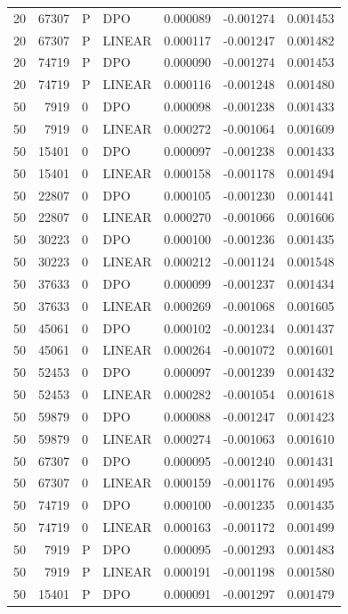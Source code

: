 \begin{longtable}{rrllrrr}
20 & 67307 & P & DPO & 0.000089 & -0.001274 & 0.001453\\
20 & 67307 & P & LINEAR & 0.000117 & -0.001247 & 0.001482\\
20 & 74719 & P & DPO & 0.000090 & -0.001274 & 0.001453\\
20 & 74719 & P & LINEAR & 0.000116 & -0.001248 & 0.001480\\
50 & 7919 & 0 & DPO & 0.000098 & -0.001238 & 0.001433\\
50 & 7919 & 0 & LINEAR & 0.000272 & -0.001064 & 0.001609\\
50 & 15401 & 0 & DPO & 0.000097 & -0.001238 & 0.001433\\
50 & 15401 & 0 & LINEAR & 0.000158 & -0.001178 & 0.001494\\
50 & 22807 & 0 & DPO & 0.000105 & -0.001230 & 0.001441\\
50 & 22807 & 0 & LINEAR & 0.000270 & -0.001066 & 0.001606\\
50 & 30223 & 0 & DPO & 0.000100 & -0.001236 & 0.001435\\
50 & 30223 & 0 & LINEAR & 0.000212 & -0.001124 & 0.001548\\
50 & 37633 & 0 & DPO & 0.000099 & -0.001237 & 0.001434\\
50 & 37633 & 0 & LINEAR & 0.000269 & -0.001068 & 0.001605\\
50 & 45061 & 0 & DPO & 0.000102 & -0.001234 & 0.001437\\
50 & 45061 & 0 & LINEAR & 0.000264 & -0.001072 & 0.001601\\
50 & 52453 & 0 & DPO & 0.000097 & -0.001239 & 0.001432\\
50 & 52453 & 0 & LINEAR & 0.000282 & -0.001054 & 0.001618\\
50 & 59879 & 0 & DPO & 0.000088 & -0.001247 & 0.001423\\
50 & 59879 & 0 & LINEAR & 0.000274 & -0.001063 & 0.001610\\
50 & 67307 & 0 & DPO & 0.000095 & -0.001240 & 0.001431\\
50 & 67307 & 0 & LINEAR & 0.000159 & -0.001176 & 0.001495\\
50 & 74719 & 0 & DPO & 0.000100 & -0.001235 & 0.001435\\
50 & 74719 & 0 & LINEAR & 0.000163 & -0.001172 & 0.001499\\
50 & 7919 & P & DPO & 0.000095 & -0.001293 & 0.001483\\
50 & 7919 & P & LINEAR & 0.000191 & -0.001198 & 0.001580\\
50 & 15401 & P & DPO & 0.000091 & -0.001297 & 0.001479\\

\end{longtable}
